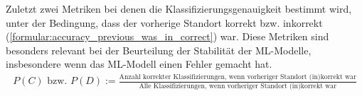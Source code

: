 Zuletzt zwei Metriken bei denen die Klassifizierungsgenauigkeit bestimmt wird, unter der Bedingung, dass der vorherige
Standort korrekt bzw. inkorrekt (\ref{formular:accuracy_previous_was_in_correct}) war.
Diese Metriken sind besonders relevant bei der Beurteilung der Stabilität der ML-Modelle, insbesondere wenn das ML-Modell einen Fehler gemacht hat.
\begin{align}
    \label{formular:accuracy_previous_was_in_correct}
    P(C)\text{ bzw. }P(D) := \frac{\text{Anzahl korrekter Klassifizierungen, wenn vorheriger Standort (in)korrekt war}}{\text{Alle Klassifizierungen, wenn vorheriger Standort (in)korrekt war}}
\end{align}